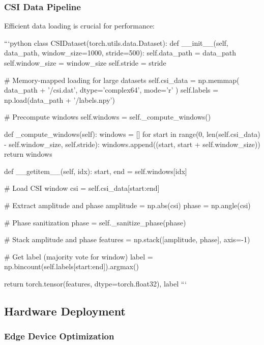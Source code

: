 \documentclass[10pt,journal,compsoc]{IEEEtran}
\begin{document}
\subsubsection{CSI Data Pipeline}

Efficient data loading is crucial for performance:

```python
class CSIDataset(torch.utils.data.Dataset):
    def __init__(self, data_path, window_size=1000, stride=500):
        self.data_path = data_path
        self.window_size = window_size
        self.stride = stride
        
        # Memory-mapped loading for large datasets
        self.csi_data = np.memmap(
            data_path + '/csi.dat',
            dtype='complex64',
            mode='r'
        )
        self.labels = np.load(data_path + '/labels.npy')
        
        # Precompute windows
        self.windows = self._compute_windows()
        
    def _compute_windows(self):
        windows = []
        for start in range(0, len(self.csi_data) - self.window_size, self.stride):
            windows.append((start, start + self.window_size))
        return windows
    
    def __getitem__(self, idx):
        start, end = self.windows[idx]
        
        # Load CSI window
        csi = self.csi_data[start:end]
        
        # Extract amplitude and phase
        amplitude = np.abs(csi)
        phase = np.angle(csi)
        
        # Phase sanitization
        phase = self._sanitize_phase(phase)
        
        # Stack amplitude and phase
        features = np.stack([amplitude, phase], axis=-1)
        
        # Get label (majority vote for window)
        label = np.bincount(self.labels[start:end]).argmax()
        
        return torch.tensor(features, dtype=torch.float32), label
```

\subsection{Hardware Deployment}

\subsubsection{Edge Device Optimization}
\end{document}
